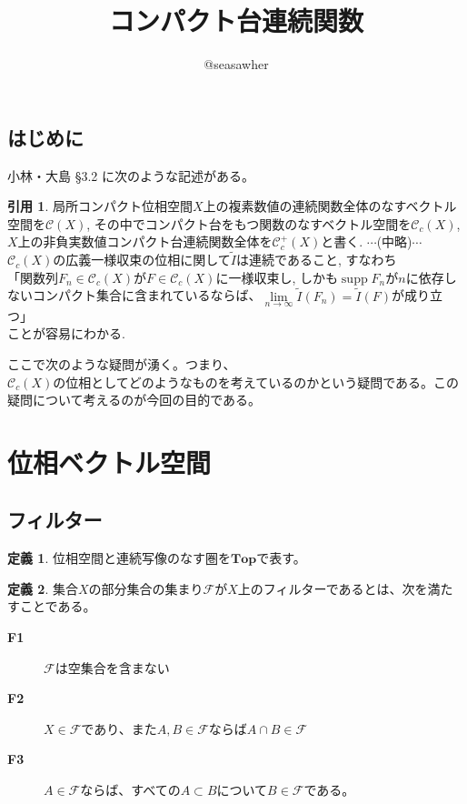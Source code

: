 ﻿\documentclass[12pt]{jsarticle}
\newcommand{\C}{\mathbb{C}}
\newcommand{\Top}{\textbf{Top}}
\newcommand{\F}{\mathcal{F}}%
\newcommand{\CX}{\mathcal{C}(X)}%
\newcommand{\CCX}{\mathcal{C}_c(X)}%
\DeclareMathOperator{\supp}{supp}
\theoremstyle{definition}%
\newtheorem{definition}{定義}[section]%
\newtheorem*{quo}{引用}%
\renewenvironment{leftbar}{%
  \renewcommand\FrameCommand{\vrule width 1pt \hspace{10pt}}%
  \MakeFramed {\advance\hsize-\width \FrameRestore}}
 {\endMakeFramed}
\newcommand{\barquo}[1]{\begin{leftbar} \begin{quo}  #1 \end{quo} \end{leftbar}}
\newenvironment{bardefinition}{ \begin{definition} \begin{leftbar}} {\end{leftbar} \end{definition}}
\newcommand{\bfsubsection}[1]{\subsection*{\textbf{#1}}}
\begin{document}
\title{コンパクト台連続関数}
\author{@seasawher}
\maketitle

\bfsubsection{はじめに}
小林・大島\cite{小林大島} \S 3.2 に次のような記述がある。
\barquo{
局所コンパクト位相空間$X$上の複素数値の連続関数全体のなすベクトル空間を$\CX$, その中でコンパクト台をもつ関数のなすベクトル空間を$\CCX$, $X$上の非負実数値コンパクト台連続関数全体を$\mathcal{C}^+_c(X)$と書く. $\cdots$(中略)$\cdots$ $\CCX$の広義一様収束の位相に関して$\widetilde{I}$は連続であること, すなわち\\
「関数列$F_n \in \CCX$が$F \in \CCX$に一様収束し, しかも$\supp F_n$が$n$に依存しないコンパクト集合に含まれているならば、$\lim\limits_{n \to \infty} \widetilde{I}(F_n)= \widetilde{I}(F)$が成り立つ」\\
ことが容易にわかる.
}
ここで次のような疑問が湧く。つまり、$\textbf{$\CCX$の位相としてどのようなものを考えているのか}$という疑問である。この疑問について考えるのが今回の目的である。
\begin{comment}
 上記の文章を省略した箇所も含めてよく読むと、その位相は次の性質を満たしているらしいことがわかる。
 \begin{description}%
   \item[性質1]$\CCX$での点列の収束$F_n \to F$が、$F_n$が$F$に一様収束してかつ$\supp F_n \subset K$なるコンパクト集合$K \subset X$が存在することと同値であるらしい。
   \item[性質2]任意の$X$上のRadon測度$\mu$に対して積分作用素$I \colon \CCX \to \C \; \text{via} \; I(f)=\int_X \cdot \, d\mu$は連続になるらしい。
 \end{description}
\end{comment}



\section{位相ベクトル空間}
\subsection*{フィルター}

\begin{bardefinition}
  位相空間と連続写像のなす圏を$\Top$で表す。
\end{bardefinition}

\begin{bardefinition}
集合$X$の部分集合の集まり$\F$が$X$上のフィルターであるとは、次を満たすことである。
\begin{description}%
\item[\textbf{F1}]$\F$は空集合を含まない
\item[\textbf{F2}]$X \in \F$であり、また$A,B \in \F$ならば$A \cap B \in \F$
\item[\textbf{F3}]$A \in \F$ならば、すべての$A \subset B$について$B \in \F$である。
\end{description}
\end{bardefinition}
\end{document}

